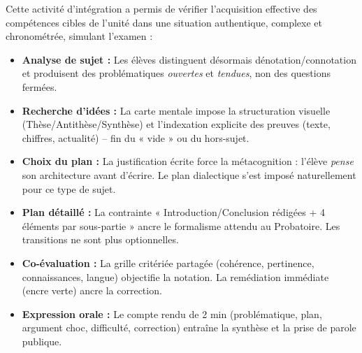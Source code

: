\documentclass[11pt]{article}
\newcounter{popsec}
\newcounter{popsub}
\newcommand{\courssub}[1]{%
  \stepcounter{popsub}%
  \par\vspace{9pt}\noindent{\popxbold\fontsize{11.5}{13}\selectfont\color{popink}{\color{poporange}\thepopsec.\thepopsub}\hspace{6pt}#1}\par\nopagebreak\vspace{4pt}
}
\begin{document}
\courssub{Bilan de l'activité}
\label{bilan:integration}
Cette activité d'intégration a permis de vérifier l'acquisition effective des compétences cibles de l'unité dans une situation authentique, complexe et chronométrée, simulant l'examen :

\begin{aretenir}
\begin{itemize}
\item \textbf{Analyse de sujet :} Les élèves distinguent désormais dénotation/connotation et produisent des problématiques \emph{ouvertes} et \emph{tendues}, non des questions fermées.
\item \textbf{Recherche d'idées :} La carte mentale impose la structuration visuelle (Thèse/Antithèse/Synthèse) et l'indexation explicite des preuves (texte, chiffres, actualité) -- fin du « vide » ou du hors-sujet.
\item \textbf{Choix du plan :} La justification écrite force la métacognition : l'élève \emph{pense} son architecture avant d'écrire. Le plan dialectique s'est imposé naturellement pour ce type de sujet.
\item \textbf{Plan détaillé :} La contrainte « Introduction/Conclusion rédigées + 4 éléments par sous-partie » ancre le formalisme attendu au Probatoire. Les transitions ne sont plus optionnelles.
\item \textbf{Co-évaluation :} La grille critériée partagée (cohérence, pertinence, connaissances, langue) objectifie la notation. La remédiation immédiate (encre verte) ancre la correction.
\item \textbf{Expression orale :} Le compte rendu de 2 min (problématique, plan, argument choc, difficulté, correction) entraîne la synthèse et la prise de parole publique.
\end{itemize}
\end{aretenir}
\end{document}
